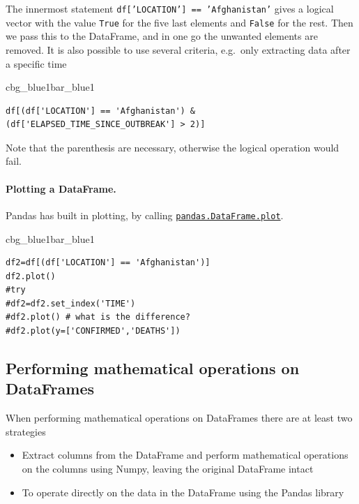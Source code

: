 \documentclass[%
oneside,                 %
final,                   %
10pt]{article}
\newenvironment{_pro_tight}[2]{
   \def\FrameCommand{\color{#2}\vrule width 1mm\normalcolor\colorbox{#1}}
   \FrameRule0.6pt\MakeFramed {\advance\hsize-2mm\FrameRestore}\vskip3mm}
   {\vskip0mm\endMakeFramed}
\newenvironment{pro}[2]{
\bgroup\rmfamily
\fboxsep=0mm\relax
\begin{_pro_tight}{#1}{#2}
\list{}{\parsep=-2mm\parskip=0mm\topsep=0pt\leftmargin=2mm
\rightmargin=2\leftmargin\leftmargin=4pt\relax}
\item\relax}
{\endlist\end{_pro_tight}\egroup}
\begin{document}
The innermost statement \texttt{df['LOCATION'] == 'Afghanistan'} gives a logical vector with the value \texttt{True} for the five last elements and \texttt{False} for the rest. Then we pass this to the DataFrame, and in one go the unwanted elements are removed. It is also possible to use several criteria, e.g.~only extracting data after a specific time


\begin{pro}{cbg_blue1}{bar_blue1}\begin{Verbatim}[numbers=none,fontsize=\fontsize{9pt}{9pt},baselinestretch=0.95,xleftmargin=2mm]
df[(df['LOCATION'] == 'Afghanistan') & (df['ELAPSED_TIME_SINCE_OUTBREAK'] > 2)]

\end{Verbatim}
\end{pro}
\noindent

Note that the parenthesis are necessary, otherwise the logical operation would fail.

\paragraph{Plotting a DataFrame.}
Pandas has built in plotting, by calling \href{{https://pandas.pydata.org/docs/reference/api/pandas.DataFrame.plot.html}}{\nolinkurl{pandas.DataFrame.plot}}.







\begin{pro}{cbg_blue1}{bar_blue1}\begin{Verbatim}[numbers=none,fontsize=\fontsize{9pt}{9pt},baselinestretch=0.95,xleftmargin=2mm]
df2=df[(df['LOCATION'] == 'Afghanistan')]
df2.plot()
#try 
#df2=df2.set_index('TIME')
#df2.plot() # what is the difference?
#df2.plot(y=['CONFIRMED','DEATHS'])

\end{Verbatim}
\end{pro}
\noindent

\subsection{Performing mathematical operations on DataFrames}
When performing mathematical operations on DataFrames there are at least two strategies
\begin{itemize}
\item Extract columns from the DataFrame and perform mathematical operations on the columns using Numpy, leaving the original DataFrame intact

\item To operate directly on the data in the DataFrame using the Pandas library
\end{itemize}
\end{document}
